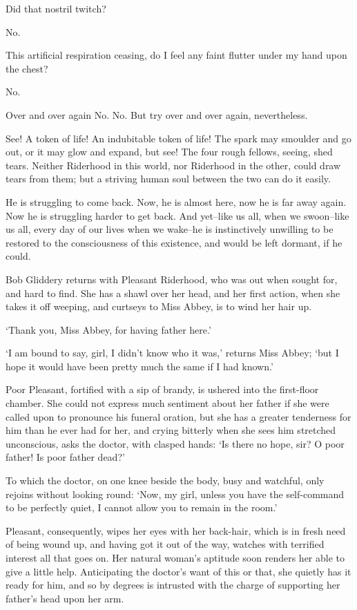 Did that nostril twitch?

No.

This artificial respiration ceasing, do I feel any faint flutter under
my hand upon the chest?

No.

Over and over again No. No. But try over and over again, nevertheless.

See! A token of life! An indubitable token of life! The spark may
smoulder and go out, or it may glow and expand, but see! The four
rough fellows, seeing, shed tears. Neither Riderhood in this world, nor
Riderhood in the other, could draw tears from them; but a striving human
soul between the two can do it easily.

He is struggling to come back. Now, he is almost here, now he is far
away again. Now he is struggling harder to get back. And yet--like us
all, when we swoon--like us all, every day of our lives when we wake--he
is instinctively unwilling to be restored to the consciousness of this
existence, and would be left dormant, if he could.

Bob Gliddery returns with Pleasant Riderhood, who was out when sought
for, and hard to find. She has a shawl over her head, and her first
action, when she takes it off weeping, and curtseys to Miss Abbey, is to
wind her hair up.

‘Thank you, Miss Abbey, for having father here.’

‘I am bound to say, girl, I didn’t know who it was,’ returns Miss Abbey;
‘but I hope it would have been pretty much the same if I had known.’

Poor Pleasant, fortified with a sip of brandy, is ushered into the
first-floor chamber. She could not express much sentiment about her
father if she were called upon to pronounce his funeral oration, but she
has a greater tenderness for him than he ever had for her, and crying
bitterly when she sees him stretched unconscious, asks the doctor, with
clasped hands: ‘Is there no hope, sir? O poor father! Is poor father
dead?’

To which the doctor, on one knee beside the body, busy and watchful,
only rejoins without looking round: ‘Now, my girl, unless you have the
self-command to be perfectly quiet, I cannot allow you to remain in the
room.’

Pleasant, consequently, wipes her eyes with her back-hair, which is in
fresh need of being wound up, and having got it out of the way, watches
with terrified interest all that goes on. Her natural woman’s aptitude
soon renders her able to give a little help. Anticipating the doctor’s
want of this or that, she quietly has it ready for him, and so by
degrees is intrusted with the charge of supporting her father’s head
upon her arm.

